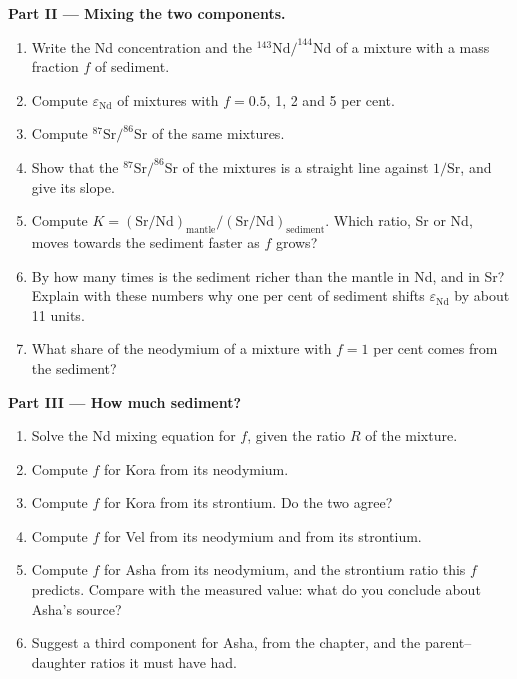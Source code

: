 \begin{problem}
\noindent\textbf{Part II --- Mixing the two components.}
\begin{enumerate}[resume]
\item Write the Nd concentration and the $^{143}\mathrm{Nd}/^{144}\mathrm{Nd}$ of a
mixture with a mass fraction $f$ of sediment.
\item Compute $\varepsilon_{\mathrm{Nd}}$ of mixtures with $f = 0.5$, 1, 2 and 5 per
cent.
\item Compute $^{87}\mathrm{Sr}/^{86}\mathrm{Sr}$ of the same mixtures.
\item Show that the $^{87}\mathrm{Sr}/^{86}\mathrm{Sr}$ of the mixtures is a straight
line against $1/\mathrm{Sr}$, and give its slope.
\item Compute $K = (\mathrm{Sr}/\mathrm{Nd})_{\text{mantle}}/(\mathrm{Sr}/\mathrm{Nd})_{\text{sediment}}$.
Which ratio, Sr or Nd, moves towards the sediment faster as $f$ grows?
\item By how many times is the sediment richer than the mantle in Nd, and in Sr?
Explain with these numbers why one per cent of sediment shifts
$\varepsilon_{\mathrm{Nd}}$ by about 11 units.
\item What share of the neodymium of a mixture with $f = 1$ per cent comes from the
sediment?
\end{enumerate}

\noindent\textbf{Part III --- How much sediment?}
\begin{enumerate}[resume]
\item Solve the Nd mixing equation for $f$, given the ratio $R$ of the mixture.
\item Compute $f$ for Kora from its neodymium.
\item Compute $f$ for Kora from its strontium. Do the two agree?
\item Compute $f$ for Vel from its neodymium and from its strontium.
\item Compute $f$ for Asha from its neodymium, and the strontium ratio this $f$
predicts. Compare with the measured value: what do you conclude about Asha's
source?
\item Suggest a third component for Asha, from the chapter, and the
parent--daughter ratios it must have had.
\end{enumerate}


\end{problem}
